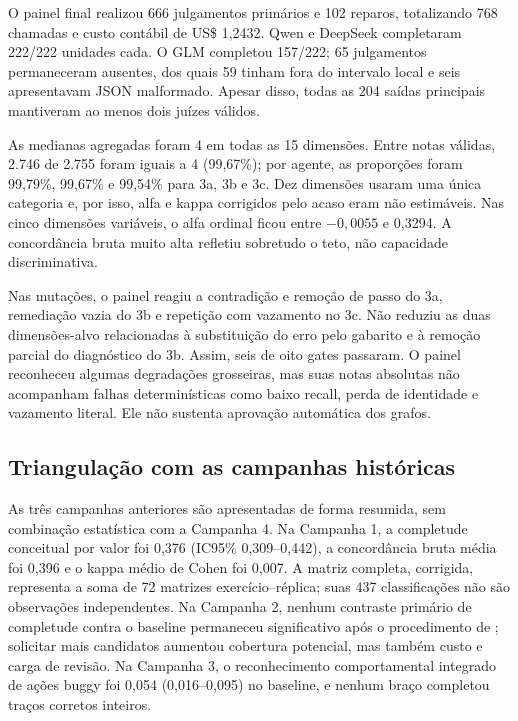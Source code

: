 \documentclass[11pt,a4paper]{article}
\begin{document}
O painel final realizou 666 julgamentos primários e 102 reparos, totalizando 768 chamadas e custo contábil de US\$ 1,2432. Qwen e DeepSeek completaram 222/222 unidades cada. O GLM completou 157/222; 65 julgamentos permaneceram ausentes, dos quais 59 tinham  fora do intervalo local e seis apresentavam JSON malformado. Apesar disso, todas as 204 saídas principais mantiveram ao menos dois juízes válidos.

As medianas agregadas foram 4 em todas as 15 dimensões. Entre notas válidas, 2.746 de 2.755 foram iguais a 4 (99,67\%); por agente, as proporções foram 99,79\%, 99,67\% e 99,54\% para 3a, 3b e 3c. Dez dimensões usaram uma única categoria e, por isso, alfa e kappa corrigidos pelo acaso eram não estimáveis. Nas cinco dimensões variáveis, o alfa ordinal ficou entre $-0{,}0055$ e 0,3294. A concordância bruta muito alta refletiu sobretudo o teto, não capacidade discriminativa.

Nas mutações, o painel reagiu a contradição e remoção de passo do 3a, remediação vazia do 3b e repetição com vazamento no 3c. Não reduziu as duas dimensões-alvo relacionadas à substituição do erro pelo gabarito e à remoção parcial do diagnóstico do 3b. Assim, seis de oito gates passaram. O painel reconheceu algumas degradações grosseiras, mas suas notas absolutas não acompanham falhas determinísticas como baixo recall, perda de identidade e vazamento literal. Ele não sustenta aprovação automática dos grafos.

\subsection{Triangulação com as campanhas históricas}

As três campanhas anteriores são apresentadas de forma resumida, sem combinação estatística com a Campanha 4. Na Campanha 1, a completude conceitual por valor foi 0,376 (IC95\% 0,309--0,442), a concordância bruta média foi 0,396 e o kappa médio de Cohen foi 0,007. A matriz completa, corrigida, representa a soma de 72 matrizes exercício--réplica; suas 437 classificações não são observações independentes. Na Campanha 2, nenhum contraste primário de completude contra o baseline permaneceu significativo após o procedimento de \citet{holm1979}; solicitar mais candidatos aumentou cobertura potencial, mas também custo e carga de revisão. Na Campanha 3, o reconhecimento comportamental integrado de ações buggy foi 0,054 (0,016--0,095) no baseline, e nenhum braço completou traços corretos inteiros.
\end{document}
